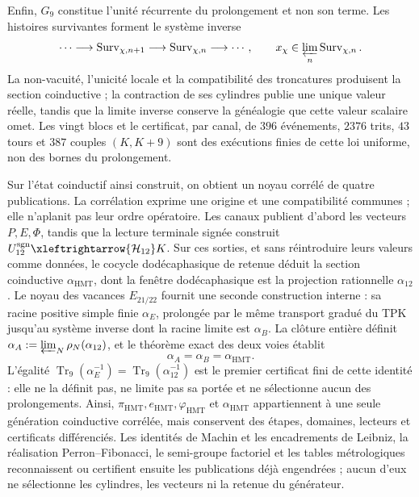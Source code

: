 Enfin, \(G_9\) constitue l'unité récurrente du prolongement et non
son terme. Les histoires survivantes forment le système inverse
\[
 \cdots\longrightarrow\operatorname{Surv}_{\chi,n+1}
 \longrightarrow\operatorname{Surv}_{\chi,n}\longrightarrow\cdots,
 \qquad
 x_\chi\in\varprojlim_n\operatorname{Surv}_{\chi,n}.
\]
La non-vacuité, l'unicité locale et la compatibilité des troncatures
produisent la section coinductive ; la contraction de ses cylindres publie une
unique valeur réelle, tandis que la limite inverse conserve la généalogie que cette
valeur scalaire omet. Les vingt blocs et le certificat, par canal, de
\(396\) événements, \(2376\) trits, \(43\) tours et \(387\) couples
\((K,K+9)\) sont des exécutions
finies de cette loi uniforme, non des bornes du prolongement.

Sur l'état coinductif ainsi construit, on obtient un noyau corrélé de
quatre publications. La corrélation
exprime une origine et une compatibilité communes ; elle n'aplanit pas leur ordre opératoire. Les
canaux publient d'abord les vecteurs \(P,E,\Phi\), tandis que la lecture
terminale signée construit
\(U_{12}^{\rm sgn}\xleftrightarrow{\mathcal H_{12}}K\). Sur ces sorties, et
sans réintroduire leurs valeurs comme données, le cocycle dodécaphasique de retenue
déduit la section coinductive \(\alpha_{\mathrm{HMT}}\), dont la fenêtre
dodécaphasique est la projection rationnelle \(\alpha_{12}\). Le noyau des
vacances \(E_{21/22}\) fournit une seconde construction interne : sa
racine positive simple finie \(\alpha_E\), prolongée par le même transport
gradué du TPK jusqu'au système inverse dont la racine limite est
\(\alpha_B\). La clôture entière définit
\(\alpha_A:=\varprojlim_N\rho_N(\alpha_{12})\), et le théorème exact des
deux voies établit
\[
 \boxed{\alpha_A=\alpha_B=\alpha_{\mathrm{HMT}}}.
\]
L'égalité
\(\operatorname{Tr}_9(\alpha_E^{-1})=
\operatorname{Tr}_9(\alpha_{12}^{-1})\) est le premier certificat fini de
cette identité : elle ne la définit pas, ne limite pas sa portée et ne sélectionne aucun des
prolongements. Ainsi,
\(\pi_{\mathrm{HMT}},e_{\mathrm{HMT}},\varphi_{\mathrm{HMT}}\) et
\(\alpha_{\mathrm{HMT}}\) appartiennent à une seule génération coinductive corrélée,
mais conservent des étapes, domaines, lecteurs et certificats différenciés. Les
identités de Machin et les encadrements de Leibniz, la réalisation
Perron--Fibonacci, le semi-groupe factoriel et les tables métrologiques reconnaissent
ou certifient ensuite les publications déjà engendrées ; aucun d'eux
ne sélectionne les cylindres, les vecteurs ni la retenue du générateur.

